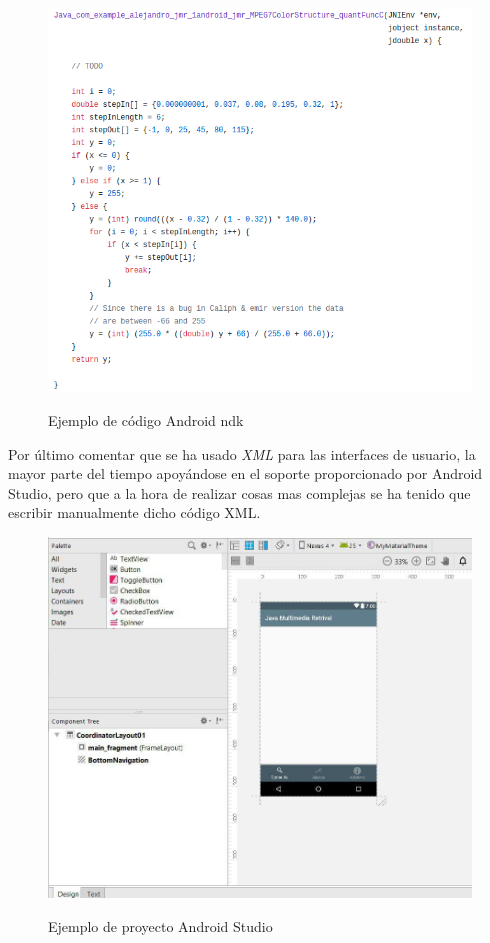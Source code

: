 \begin{figure}[H] %
\centering
\includegraphics[scale=0.6]{imagenes/ndk.png}  %
\label{ndk.png}
\caption{Ejemplo de código Android ndk}
\end{figure}

Por último comentar que se ha usado \textit{XML} para las interfaces de usuario, la mayor parte del tiempo apoyándose en el soporte proporcionado por Android Studio, pero que a la hora de realizar cosas mas complejas se ha tenido que escribir manualmente dicho código XML.

\begin{figure}[H] %
\centering
\includegraphics[scale=0.6]{imagenes/interfaz-android-studio.jpg}  %
\label{interfaz-android-studio.jpg}
\caption{Ejemplo de proyecto Android Studio}
\end{figure}

